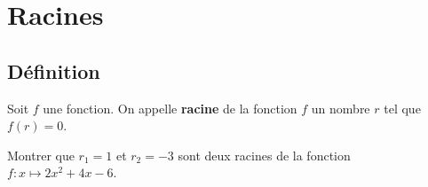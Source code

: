 \documentclass{article}
\begin{document}
\newpage

\section{Racines}

\subsection{Définition}

\begin{tcolorbox}
\begin{definition}
Soit $f$ une fonction. On appelle \textbf{racine} de la fonction $f$ un nombre $r$ tel que $f(r) = 0$.
\end{definition}
\end{tcolorbox}
\begin{example}
Montrer que $r_1 = 1$ et $r_2 = - 3$ sont deux racines de la fonction $f : x \mapsto 2x^2 + 4x - 6$.

\emptybox{3cm}
\end{example}
\end{document}
